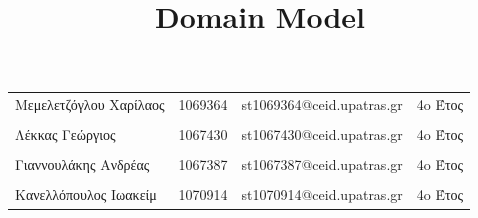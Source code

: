 \documentclass{../ol-softwaremanual}
\begin{document}
	
	
	\begin{titlepage}
		
		
		\title{\en Domain Model \\}
	\end{titlepage}
	
	
	\maketitle
	
	\newpage
	
	
	\vspace{20pt}
	
	
	
	\begin{table}[htbp!]
		
		\begin{tabular}{llll}
			Μεμελετζόγλου Χαρίλαος & 1069364 & \en st1069364@ceid.upatras.gr & 4o Έτος   \\ 
			\\ Λέκκας Γεώργιος      &      1067430    &   \en st1067430@ceid.upatras.gr & 4o Έτος  \\
			\\ Γιαννουλάκης Ανδρέας        &   1067387       & \en st1067387@ceid.upatras.gr & 4o Έτος           \\
			\\ Κανελλόπουλος Ιωακείμ        &  1070914        &    \en st1070914@ceid.upatras.gr & 4o Έτος        \\ 
		\end{tabular}
	\end{table}
	
\end{document}
